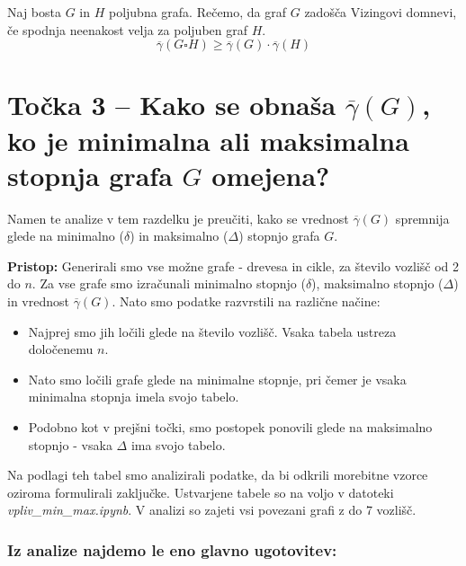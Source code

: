 \documentclass[a4paper, 12pt]{article}
\begin{document}
\begin{center}
  \noindent Naj bosta \(G\) in \(H\) poljubna grafa. Rečemo, da graf \(G\) zadošča Vizingovi domnevi, če spodnja neenakost velja za poljuben graf \(H\). 
\[
\overline{\gamma}(G \square H) \geq \overline{\gamma}(G) \cdot \overline{\gamma}(H)
\]
  
\end{center}







\newpage

\section*{Točka 3 –  Kako se obnaša $\overline\gamma(G)$, ko je minimalna ali maksimalna stopnja grafa \( G \) omejena?}

Namen te analize v tem razdelku je preučiti, kako se vrednost $\overline{\gamma}(G)$ spremnija glede na minimalno ($\delta$) in maksimalno ($\Delta$) stopnjo grafa $G$.

\noindent \textbf{Pristop:} Generirali smo vse možne grafe - drevesa in cikle, za število vozlišč od 2 do $n$. Za vse grafe smo izračunali minimalno stopnjo ($\delta$), maksimalno stopnjo ($\Delta$) in vrednost $\overline{\gamma}(G)$. Nato smo podatke razvrstili na različne načine:

\begin{itemize}

    \item Najprej smo jih ločili glede na število vozlišč. Vsaka tabela ustreza določenemu $n$.

    \item Nato smo ločili grafe glede na minimalne stopnje, pri čemer je vsaka minimalna stopnja imela svojo tabelo.

    \item Podobno kot v prejšni točki, smo postopek ponovili glede na maksimalno stopnjo - vsaka $\Delta$ ima svojo tabelo.
     
\end{itemize}    


\noindent Na podlagi teh tabel smo analizirali podatke, da bi odkrili morebitne vzorce oziroma formulirali zaključke. Ustvarjene tabele so na voljo v datoteki \textit{vpliv\_min\_max.ipynb}. V analizi so zajeti vsi povezani grafi z do 7 vozlišč.



\subsubsection*{Iz analize najdemo le eno glavno ugotovitev:}
\end{document}
